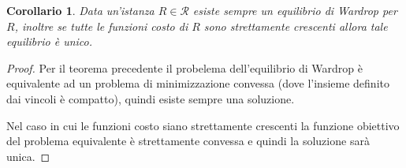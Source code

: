 \documentclass[a4paper]{article}
\newcounter{counter1}
\theoremstyle{plain}
\newtheorem{mycor}[counter1]{Corollario}
\theoremstyle{definition}
\theoremstyle{remark}
\begin{document}
\begin{mycor}
  Data un'istanza $R\in \mathcal{R}$ esiste sempre un equilibrio di
  Wardrop per $R$, inoltre se tutte le funzioni costo di $R$ sono
  strettamente crescenti allora tale equilibrio è unico.
\end{mycor}
\begin{proof}
  Per il teorema precedente il probelema dell'equilibrio di Wardrop è
  equivalente ad un problema di minimizzazione convessa (dove
  l'insieme definito dai vincoli è compatto), quindi esiste sempre una
  soluzione.

  Nel caso in cui le funzioni costo siano strettamente crescenti la
  funzione obiettivo del problema equivalente è strettamente convessa
  e quindi la soluzione sarà unica.
\end{proof}
\end{document}
